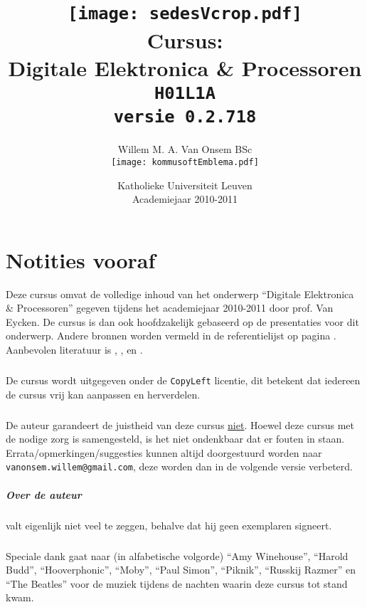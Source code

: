 \documentclass[a4paper,10pt,titlepage]{book}
\title{\texttt{[image: sedesVcrop.pdf]}\\Cursus:\\Digitale Elektronica \& Processoren\\\texttt{H01L1A}\\\texttt{\small versie 0.2.718}}
\author{Willem M. A. Van Onsem BSc\\\texttt{[image: kommusoftEmblema.pdf]}}
\date{Katholieke Universiteit Leuven\\Academiejaar 2010-2011}
\begin{document}
\frontmatter
\begin{titlepage}
\maketitle
\end{titlepage}
\tableofcontents
\chapter*{Notities vooraf}
\begin{it}
Deze cursus omvat de volledige inhoud van het onderwerp ``Digitale Elektronica \& Processoren'' gegeven tijdens het academiejaar 2010-2011 door prof. Van Eycken. De cursus is dan ook hoofdzakelijk gebaseerd op de presentaties voor dit onderwerp. Andere bronnen worden vermeld in de referentielijst op pagina \pageref{reference}. Aanbevolen literatuur is \cite{brown2004fundamentals}, \cite{gajski1997principles}, \cite{wakerly2000digital} en \cite{ashenden2008designer}.
\paragraph{}
De cursus wordt uitgegeven onder de \texttt{CopyLeft} licentie, dit betekent dat iedereen de cursus vrij kan aanpassen en herverdelen.
\paragraph{}
De auteur garandeert de juistheid van deze cursus \underline{niet}. Hoewel deze cursus met de nodige zorg is samengesteld, is het niet ondenkbaar dat er fouten in staan. Errata/opmerkingen/suggesties kunnen altijd doorgestuurd worden naar \verb+vanonsem.willem@gmail.com+, deze worden dan in de volgende versie verbeterd.
\paragraph{Over de auteur}
valt eigenlijk niet veel te zeggen, behalve dat hij geen exemplaren signeert.
\paragraph{}
Speciale dank gaat naar (in alfabetische volgorde) ``Amy Winehouse'', ``Harold Budd'', ``Hooverphonic'', ``Moby'', ``Paul Simon'', ``Piknik'', ``Russkij Razmer'' en ``The Beatles'' voor de muziek tijdens de nachten waarin deze cursus tot stand kwam.

\end{it}
\end{document}

